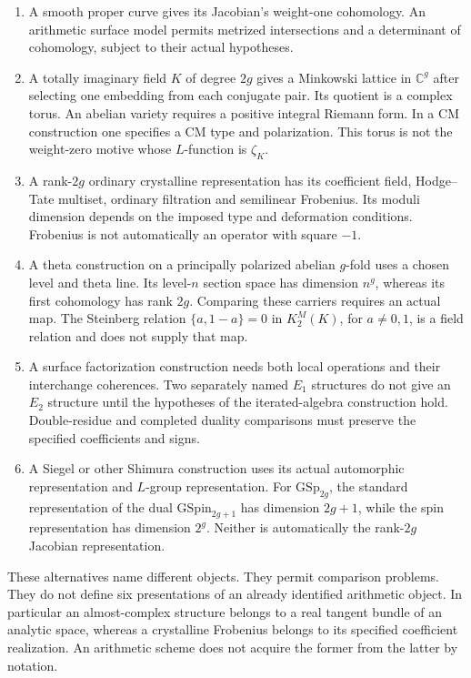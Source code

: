 \begin{enumerate}
\item A smooth proper curve gives its Jacobian's weight-one cohomology. An
arithmetic surface model permits metrized intersections and a determinant of
cohomology, subject to their actual hypotheses. \item A totally imaginary
field $K$ of degree $2g$ gives a Minkowski lattice in $\mathbb C^g$ after
selecting one embedding from each conjugate pair. Its quotient is a complex
torus. An abelian variety requires a positive integral Riemann form. In a CM
construction one specifies a CM type and polarization. This torus is not the
weight-zero motive whose $L$-function is $\zeta_K$. \item A rank-$2g$
ordinary crystalline representation has its coefficient field, Hodge--Tate
multiset, ordinary filtration and semilinear Frobenius. Its moduli dimension
depends on the imposed type and deformation conditions. Frobenius is not
automatically an operator with square $-1$. \item A theta construction on a
principally polarized abelian $g$-fold uses a chosen level and theta line.
Its level-$n$ section space has dimension $n^g$, whereas its first
cohomology has rank $2g$. Comparing these carriers requires an actual map.
The Steinberg relation $\{a,1-a\}=0$ in $K_2^M(K)$, for $a\ne0,1$, is a
field relation and does not supply that map. \item A surface factorization
construction needs both local operations and their interchange coherences.
Two separately named $E_1$ structures do not give an $E_2$ structure until
the hypotheses of the iterated-algebra construction hold. Double-residue and
completed duality comparisons must preserve the specified coefficients and
signs. \item A Siegel or other Shimura construction uses its actual
automorphic representation and $L$-group representation. For
$\mathrm{GSp}_{2g}$, the standard representation of the dual
$\mathrm{GSpin}_{2g+1}$ has dimension $2g+1$, while the spin representation
has dimension $2^g$. Neither is automatically the rank-$2g$ Jacobian
representation.
\end{enumerate}

These alternatives name different objects. They permit comparison problems.
They do not define six presentations of an already identified arithmetic
object. In particular an almost-complex structure belongs to a real tangent
bundle of an analytic space, whereas a crystalline Frobenius belongs to its
specified coefficient realization. An arithmetic scheme does not acquire the
former from the latter by notation.

